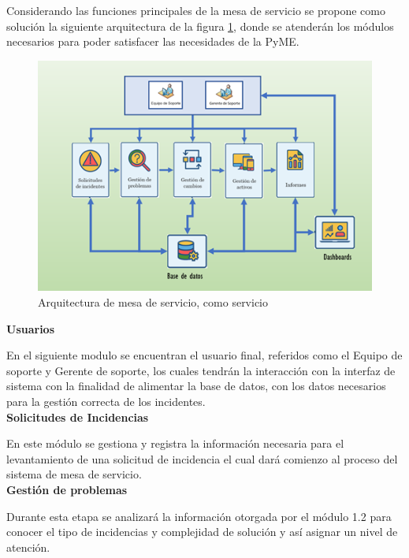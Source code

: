 Considerando las funciones principales de la mesa de servicio se propone como solución la siguiente arquitectura de la figura \ref{fig:DMDS}, donde se atenderán los módulos necesarios para poder satisfacer las necesidades de la PyME.

\begin{figure}[H]
	\centering
	\includegraphics[width=1.1\textwidth]{Capitulo1/Img/MesadeServicioDiagrama}
	\caption{Arquitectura de mesa de servicio, como servicio}
	\label{fig:DMDS}
\end{figure}

\textbf{ Usuarios }

En el siguiente modulo se encuentran el usuario final, referidos como el Equipo de soporte y Gerente de soporte, los cuales tendrán la interacción con la interfaz de sistema con la finalidad de alimentar la base de datos, con los datos necesarios para la gestión correcta de los incidentes.\\

\textbf{Solicitudes de Incidencias }

En este módulo se gestiona y registra la información necesaria para el levantamiento de una solicitud de incidencia el cual dará comienzo al proceso del sistema de mesa de servicio.\\

\textbf{Gestión de problemas }

Durante esta etapa se analizará la información otorgada por el módulo 1.2 para conocer el tipo de incidencias y complejidad de solución y así asignar un nivel de atención.\\



